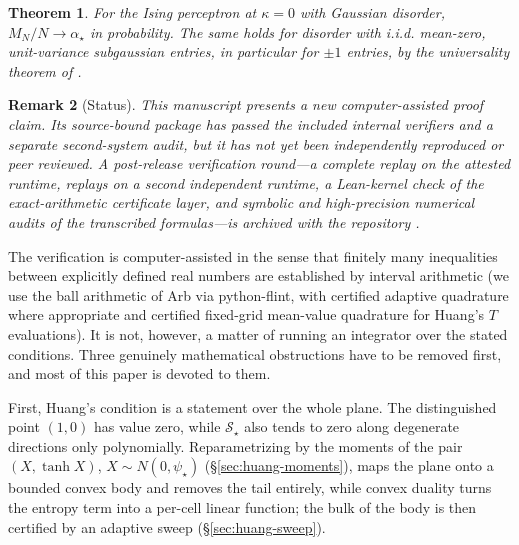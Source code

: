 \documentclass[11pt]{article}
\newtheorem{theorem}{Theorem}[section]
\newtheorem{remark}[theorem]{Remark}
\begin{document}
\begin{theorem}\label{thm:main}
For the Ising perceptron at $\kappa = 0$ with Gaussian disorder,
$M_N/N \to \alpha_\star$ in probability. The same holds for disorder with
i.i.d. mean-zero, unit-variance subgaussian entries, in particular for $\pm 1$
entries, by the universality theorem of \cite{nakajima2023sharp}.
\end{theorem}

\begin{remark}[Status]
This manuscript presents a new computer-assisted proof claim. Its
source-bound package has passed the included internal verifiers and a separate
second-system audit, but it has not yet been independently reproduced or peer
reviewed. A post-release verification round---a complete replay on the
attested runtime, replays on a second independent runtime, a Lean-kernel
check of the exact-arithmetic certificate layer, and symbolic and
high-precision numerical audits of the transcribed formulas---is archived
with the repository \cite{repo}.
\end{remark}

The verification is computer-assisted in the sense that finitely many
inequalities between explicitly defined real numbers are established by
interval arithmetic (we use the ball arithmetic of Arb via python-flint,
with certified adaptive quadrature where appropriate and certified fixed-grid
mean-value quadrature for Huang's $T$ evaluations). It is not, however,
a matter of running an integrator over the stated conditions. Three
genuinely mathematical obstructions have to be removed first, and most of
this paper is devoted to them.

First, Huang's condition is a statement over the whole plane. The
distinguished point $(1,0)$ has value zero, while $\mathcal{S}_\star$ also tends to zero along
degenerate directions only polynomially. Reparametrizing by the
moments of the pair $(X,\tanh X)$, $X\sim N(0,\psi_\star)$
(\S\ref{sec:huang-moments}), maps the plane onto a bounded convex body and
removes the tail entirely, while convex duality turns the entropy term into
a per-cell linear function; the bulk of the body is then certified by an
adaptive sweep (\S\ref{sec:huang-sweep}).
\end{document}
